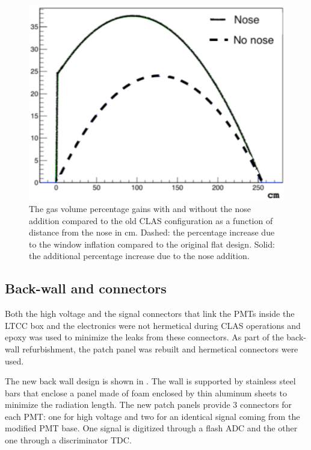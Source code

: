 \begin{figure}
	\centering
	\includegraphics[width=0.98\columnwidth, height=0.7\columnwidth]{img/noseVolume.png}
	\caption{The gas volume percentage gains with and without the nose addition compared to the old CLAS configuration as a function of
            distance from the nose in cm. Dashed: the percentage increase due to the window inflation compared to the original flat design.
            Solid: the additional percentage increase due to the nose addition.}
	\label{fig:noseVolume}
\end{figure}


\subsection{Back-wall and connectors}

Both the high voltage and the signal connectors that link the PMTs inside the LTCC box and the electronics were not
hermetical during CLAS operations and epoxy was used to minimize the leaks from these connectors.
As part of the back-wall refurbishment, the patch panel was rebuilt and hermetical connectors were used.

The new back wall design is shown in . The wall is supported by stainless steel bars that enclose a panel made of foam enclosed by
thin aluminum sheets to minimize the radiation length.
The new patch panels provide 3 connectors for each PMT: one for high voltage and two for an identical signal coming from the modified PMT base.
One signal is digitized through a flash ADC and the other one through a discriminator TDC.

